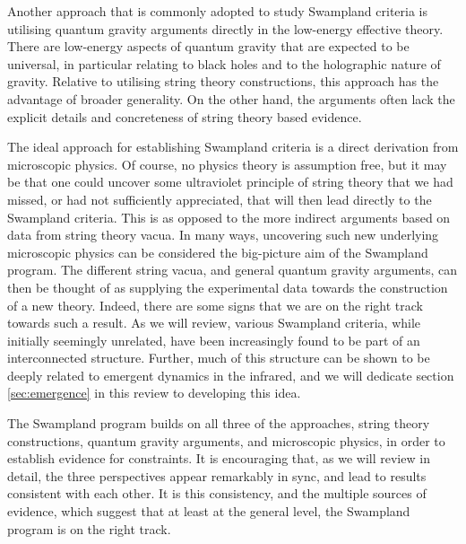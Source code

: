 \documentclass[11pt,a4paper]{article}
\numberwithin{equation}{section}
\numberwithin{table}{section}\setlength{\multlinegap}{25pt}
\begin{document}
Another approach that is commonly adopted to study Swampland criteria is utilising quantum gravity arguments directly in the low-energy effective theory. There are low-energy aspects of quantum gravity that are expected to be universal, in particular relating to black holes and to the holographic nature of gravity. Relative to utilising string theory constructions, this approach has the advantage of broader generality. On the other hand, the arguments often lack the explicit details and concreteness of string theory based evidence. 

The ideal approach for establishing Swampland criteria is a direct derivation from microscopic physics. Of course, no physics theory is assumption free, but it may be that one could uncover some ultraviolet principle of string theory that we had missed, or had not sufficiently appreciated, that will then lead directly to the Swampland criteria. This is as opposed to the more indirect arguments based on data from string theory vacua. In many ways, uncovering such new underlying microscopic physics can be considered the big-picture aim of the Swampland program. The different string vacua, and general quantum gravity arguments, can then be thought of as supplying the experimental data towards the construction of a new theory. Indeed, there are some signs that we are on the right track towards such a result. As we will review, various Swampland criteria, while initially seemingly unrelated, have been increasingly found to be part of an interconnected structure. Further, much of this structure can be shown to be deeply related to emergent dynamics in the infrared, and we will dedicate section \ref{sec:emergence} in this review to developing this idea. 

The Swampland program builds on all three of the approaches, string theory constructions, quantum gravity arguments, and microscopic physics, in order to establish evidence for constraints. It is encouraging that, as we will review in detail, the three perspectives appear remarkably in sync, and lead to results consistent with each other. It is this consistency, and the multiple sources of evidence, which suggest that at least at the general level, the Swampland program is on the right track.
\end{document}
